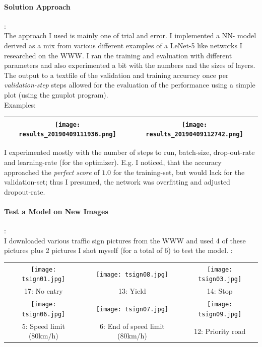 \documentclass[a4paper]{article}
\begin{document}
\paragraph{Solution Approach}
:\\
The approach I used is mainly one of trial and error. I implemented a NN- model
derived as a mix from various different examples of a LeNet-5 like networks I researched
on the WWW. I ran the training and evaluation with different parameters and also
experimented a bit with the numbers and the sizes of layers.\\
The output to a textfile of the validation and training accuracy
once per \textit{validation-step} steps allowed for the evaluation of the
performance using a simple plot (using the gnuplot program).\\
Examples:\\
\begin{tabular}{ |c|c| }
  \hline
  \texttt{[image: results\_20190409111936.png]} & \texttt{[image: results\_20190409112742.png]} \\
  \hline
\end{tabular}

I experimented mostly with the number of steps to run, batch-size, drop-out-rate
and learning-rate (for the optimizer). E.g. I noticed, that the accuracy
approached the \textit{perfect score} of $1.0$ for the training-set, but would lack
for the validation-set; thus I presumed, the network was overfitting and adjusted
dropout-rate.

\paragraph{Test a Model on New Images}
:\\
I downloaded various traffic sign pictures from the WWW and used 4 of these pictures
plus 2 pictures I shot myself (for a total of 6) to test the model.
:\\
\small
\begin{tabular}{ |c|c|c| }
  \hline
  \texttt{[image: tsign01.jpg]} & \texttt{[image: tsign08.jpg]} & \texttt{[image: tsign03.jpg]} \\
  17: No entry & 13: Yield & 14: Stop \\
  \hline
  \texttt{[image: tsign06.jpg]} & \texttt{[image: tsign07.jpg]} & \texttt{[image: tsign09.jpg]}\\
  5: Speed limit (80km/h) & 6: End of speed limit (80km/h) & 12: Priority road \\
  \hline
\end{tabular}
\normalsize
\end{document}
